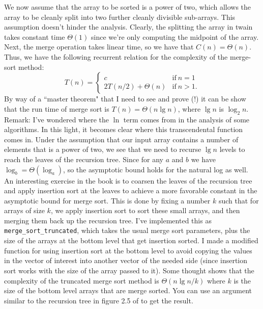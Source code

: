 \documentclass[12pt,english]{article}
\begin{document}
We now assume that the array to be sorted is a power of two, which allows the array to be cleanly split into two further cleanly divisible sub-arrays.  This assumption doesn't hinder the analysis.  Clearly, the splitting the array in twain takes constant time $\Theta(1)$ since we're only computing the midpoint of the array.  Next, the merge operation takes linear time, so we have that $C(n) = \Theta(n)$.  Thus, we have the following recurrent relation for the complexity of the merge-sort method:
$$
T(n) = 
\left\{
\begin{array}{cc}
c				& 	\text{if}~n=1 \\
2T(n/2) + \Theta(n)	&	\text{if}~n>1.
\end{array}
\right.
$$
By way of a ``master theorem" that I need to see and prove (!) it can be show that the run time of merge sort is $T(n) = \Theta(n \lg n)$, where $\lg n$ is $\log_2 n$.  Remark: I've wondered where the $\ln$ term comes from in the analysis of some algorithms.  In this light, it becomes clear where this transcendental function comes in.   Under the assumption that our input array contains a number of elements that is a power of two, we see that we need to recurse $\lg n$ levels to reach the leaves of the recursion tree.  Since for any $a$ and $b$ we have $\log_b = \Theta(\log_a)$, so the asymptotic bound holds for the natural log as well.  \\

An interesting exercise in the book is to coarsen the leaves of the recursion tree and apply insertion sort at the leaves to achieve a more favorable constant in the asymptotic bound for merge sort.  This is done by fixing a number $k$ such that for arrays of size $k$, we apply insertion sort to sort these small arrays, and then merging them back up the recursion tree.  I've implemented this as \texttt{merge\_sort\_truncated}, which takes the usual merge sort parameters, plus the size of the arrays at the bottom level that get insertion sorted.  I made a modified function for using insertion sort at the bottom level to avoid copying the values in the vector of interest into another vector of the needed side (since insertion sort works with the size of the array passed to it).  Some thought shows that the complexity of the truncated merge sort method is $\Theta(n\lg n/k)$ where $k$ is the size of the bottom level arrays that are merge sorted.  You can use an argument similar to the recursion tree in figure 2.5 of \cite{CoStRiLe:2001} to get the result.

{}

\end{document}
